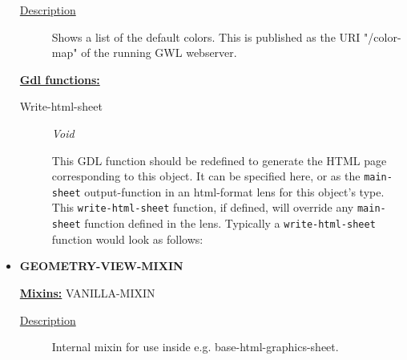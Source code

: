 \documentclass [11pt]{book}
\begin{document}
\begin{itemize}
\begin{description}

\item [
\underline{Description}]


Shows a list of the default colors. This is published as the URI "/color-map" of the running GWL webserver.



\end{description}








\textbf{
\underline{Gdl functions:}}

\begin{description}

\item [Write-html-sheet]
\emph{Void}

 This GDL function should be redefined to generate the HTML page corresponding to this object.
It can be specified here, or as the \texttt{main-sheet} output-function in an html-format lens for this
object's type. This \texttt{write-html-sheet} function, if defined,  will override any \texttt{main-sheet}
function defined in the lens. Typically a \texttt{write-html-sheet} function would look as follows:




\end{description}







\item {}
\label{prim:geometry-view-mixin}
\textbf{GEOMETRY-VIEW-MIXIN}


\textbf{
\underline{Mixins:}} VANILLA-MIXIN





\begin{description}

\item [
\underline{Description}]


Internal mixin for use inside e.g. base-html-graphics-sheet.



\end{description}









\end{itemize}
\end{document}
